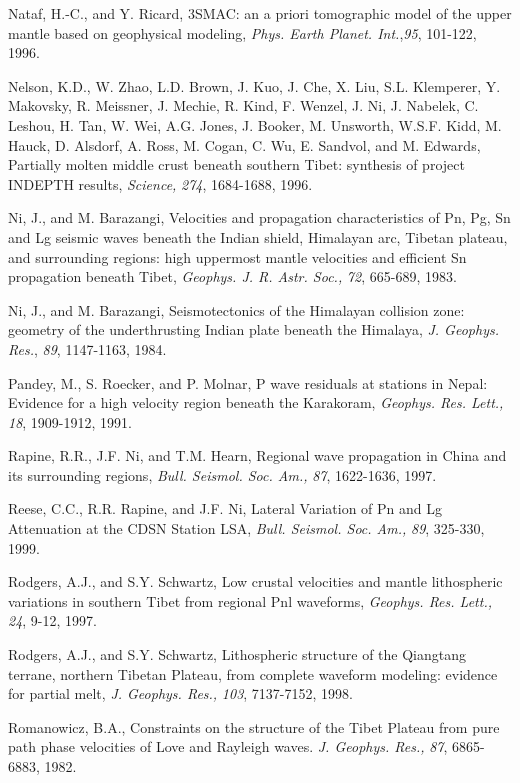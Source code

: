 \documentclass[12pt]{article}
\begin{document}
\begin{references}
Nataf, H.-C., and Y. Ricard, {3SMAC: an a priori tomographic
model of the upper mantle based on geophysical modeling}, {\it
Phys. Earth Planet. Int.},{\it 95}, {101-122}, 1996.

Nelson, K.D., W. Zhao, L.D. Brown, J. Kuo, J. Che, X. Liu, S.L. Klemperer,
Y. Makovsky, R. Meissner, J. Mechie, R. Kind, F. Wenzel, J. Ni, J. Nabelek,
C. Leshou, H. Tan, W. Wei, A.G. Jones, J. Booker, M. Unsworth, W.S.F. Kidd,
M. Hauck, D. Alsdorf, A. Ross, M. Cogan, C. Wu, E. Sandvol, and M. Edwards,
Partially molten middle crust beneath southern Tibet: synthesis of
project INDEPTH results, {\it Science,} {\it 274}, 1684-1688, 1996.

Ni, J., and M. Barazangi, Velocities and propagation characteristics
of Pn, Pg, Sn and Lg seismic waves beneath the Indian shield, Himalayan arc,
Tibetan plateau, and surrounding regions: high uppermost mantle velocities
and efficient Sn propagation beneath Tibet, {\it Geophys. J. R. Astr. Soc.,}
{\it 72}, 665-689, 1983.

Ni, J., and M. Barazangi, Seismotectonics of the Himalayan collision zone:
geometry of the underthrusting Indian plate beneath the Himalaya, {\it J.
Geophys. Res.}, {\it 89}, 1147-1163, 1984.

Pandey, M., S. Roecker, and P. Molnar, P wave residuals at stations in
Nepal: Evidence for a high velocity region beneath the Karakoram, {\it Geophys.
Res. Lett.,} {\it 18}, 1909-1912, 1991.



Rapine, R.R., J.F. Ni, and T.M. Hearn, Regional wave propagation in China
and its surrounding regions, {\it Bull. Seismol. Soc. Am.,} {\it 87},
1622-1636, 1997.

Reese, C.C., R.R. Rapine, and J.F. Ni, Lateral Variation of Pn and Lg
Attenuation at the CDSN Station LSA, {\it Bull. Seismol. Soc. Am.,} {\it 89},
325-330, 1999.

Rodgers, A.J., and S.Y. Schwartz, Low crustal velocities and mantle
lithospheric variations in southern Tibet from regional Pnl waveforms,
{\it Geophys. Res. Lett.,} {\it 24}, 9-12, 1997.

Rodgers, A.J., and S.Y. Schwartz, Lithospheric structure of the
Qiangtang terrane, northern Tibetan Plateau, from complete waveform
modeling: evidence for partial melt, {\it J. Geophys. Res.,} {\it 103},
7137-7152, 1998.

Romanowicz, B.A., Constraints on the structure of the Tibet Plateau
from pure path phase velocities of Love and Rayleigh waves. {\it J. Geophys.
Res.,} {\it 87}, 6865-6883, 1982.


\end{references}
\end{document}
